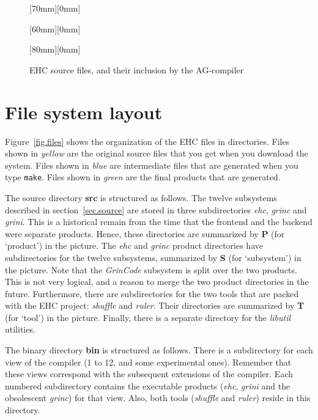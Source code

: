 \begin{figure}[tbp]




\raisebox{10mm}[70mm][0mm]{}

\raisebox{0mm}[60mm][0mm]{}

\raisebox{0mm}[80mm][0mm]{}

\caption{EHC source files, and their inclusion by the AG-compiler}
\label{fig.ag-import}
\end{figure}



\clearpage


\clearpage

\section{File system layout}\label{sec.files}


Figure~\ref{fig.files} shows the organization of the EHC files in directories.
Files shown in {\em yellow} are the original source files that you get when you download the system.
Files shown in {\em blue} are intermediate files that are generated when you type \verb"make".
Files shown in {\em green} are the final products that are generated.

The source directory {\bf src} is structured as follows.
The twelve subsystems described in section~\ref{sec.source} are stored
in three subdirectories {\em ehc}, {\em grinc} and {\em grini}.
This is a historical remain from the time that the frontend and the backend
were separate products. Hence, these directories are summarized by {\bf P} (for `product')
in the picture.
The {\em ehc} and {\em grinc} product directories have subdirectories for the twelve subsystems, 
summarized by {\bf S} (for `subsystem') in the picture.
Note that the {\em GrinCode} subsystem is split over the two products.
This is not very logical, and a reason to merge the two product directories in the future.
Furthermore, there are subdirectories for the two tools that are packed with the
EHC project: {\em shuffle} and {\em ruler}.
Their directories are summarized by {\bf T} (for `tool') in the picture. 
Finally, there is a separate directory for the {\em libutil} utilities.

The binary directory {\bf bin} is structured as follows.
There is a subdirectory for each view of the compiler (1 to 12, and some experimental ones).
Remember that these views correspond with the subsequent extensions of the compiler.
Each numbered subdirectory contains the executable products ({\em ehc}, {\em grini} and the obsolescent {\em grinc})
for that view.
Also, both tools ({\em shuffle} and {\em ruler}) reside in this directory.

